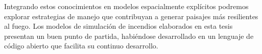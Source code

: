\noindent Integrando estos conocimientos en modelos espacialmente explícitos podremos explorar estrategias de manejo que contribuyan a generar paisajes más resilientes al fuego. Los modelos de simulación de incendios elaborados en esta tesis presentan un buen punto de partida, habiéndose desarrollado en un lenguaje de código abierto que facilita su continuo desarrollo.
